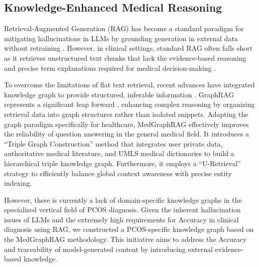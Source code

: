 \documentclass[a4paper,fleqn]{cas-dc}
\begin{document}
\subsection{Knowledge-Enhanced Medical Reasoning}
Retrieval-Augmented Generation (RAG) has become a standard paradigm for mitigating hallucinations in LLMs by grounding generation in external data without retraining \cite{lewis2020retrieval,guu2020retrieval}. However, in clinical settings, standard RAG often falls short as it retrieves unstructured text chunks that lack the evidence-based reasoning and precise term explanations required for medical decision-making \cite{miao2024integrating}.

To overcome the limitations of flat text retrieval, recent advances have integrated knowledge graph to provide structured, inferable information \cite{8530028,izacard2021unsupervised}. GraphRAG \cite{edge2024local} represents a significant leap forward , enhancing complex reasoning by organizing retrieval data into graph structures rather than isolated snippets. Adapting the graph paradigm specifically for healthcare, MedGraphRAG \cite{wu-etal-2025-medical} effectively improves the reliability of question answering in the general medical field. It introduces a ``Triple Graph Construction'' method that integrates user private data, authoritative medical literature, and UMLS medical dictionaries to build a hierarchical triple knowledge graph. Furthermore, it employs a ``U-Retrieval'' strategy to efficiently balance global context awareness with precise entity indexing.

However, there is currently a lack of domain-specific knowledge graphs in the specialized vertical field of PCOS diagnosis. Given the inherent hallucination issues of LLMs and the extremely high requirements for Accuracy in clinical diagnosis using RAG, we constructed a PCOS-specific knowledge graph based on the MedGraphRAG methodology. This initiative aims to address the Accuracy and traceability of model-generated content by introducing external evidence-based knowledge.

\end{document}
